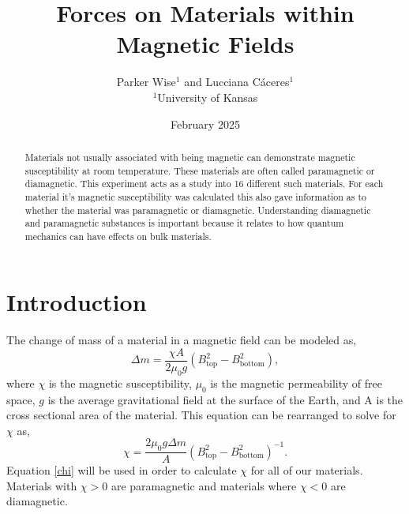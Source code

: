 \documentclass[%
 reprint,
 amsmath,amssymb,
 aps,
 10pt
]{revtex4-2}
\begin{document}
\begin{abstract}
	  Materials not usually associated with being magnetic can demonstrate magnetic susceptibility at room temperature. These materials are often called paramagnetic or diamagnetic. This experiment acts as a study into 16 different such materials. For each material it's magnetic susceptibility was calculated this also gave information as to whether the material was paramagnetic or diamagnetic. Understanding diamagnetic and paramagnetic substances is important because it relates to how quantum mechanics can have effects on bulk materials.
\end{abstract}
\title[title]{Forces on Materials within Magnetic Fields}
\author{Parker Wise$^{1}$ and Lucciana Cáceres$^{1}$\\$^{1}$University of Kansas}
\date{February 2025}
\maketitle
\showthe\textwidth
\section{Introduction}
The change of mass of a material in a magnetic field can be modeled as,
\begin{equation}
	\Delta m = \frac{\chi A}{2\mu_0 g}\left(B_\mathrm{top}^2-B_\mathrm{bottom}^2\right),
	\label{mass}
\end{equation}
where $\chi$ is the magnetic susceptibility, $\mu_0$ is the magnetic permeability of free space, $g$ is the average gravitational field at the surface of the Earth, and A is the cross sectional area of the material. This equation can be rearranged to solve for $\chi$ as,
\begin{equation}
	\chi = \frac{2\mu_0 g\Delta m}{A}\left(B_\mathrm{top}^2-B_\mathrm{bottom}^2\right)^{-1}.
	\label{chi}
\end{equation}
Equation \ref{chi} will be used in order to calculate $\chi$ for all of our materials. Materials with $\chi > 0$ are paramagnetic and materials where $\chi < 0$ are diamagnetic.
\end{document}
